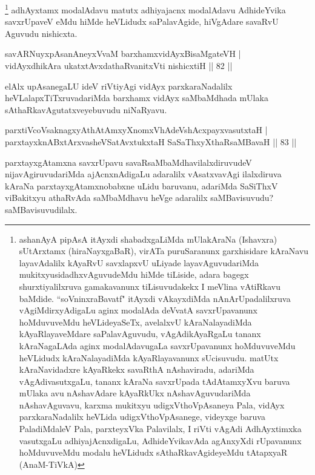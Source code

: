 \begin{artha}%
\footnote[1]{ashanAyA pipAsA itAyxdi shabadxgaLiMda mUlakAraNa (Ishavxra) sUtArxtamx (hiraNayxgaBaR), virATa puruSaranunx garxhisidare kAraNavu layavAdalilx kAyaRvU savxlapxvU uLiyade layavAguvudariMda mukitxyusidadhxvAguvudeMdu hiMde tiLiside, adara bagegx shurxtiyalilxruva gamakavanunx tiLisuvudakekx I meVlina vAtiRkavu baMdide. ``soV\s ninxraBavatf" itAyxdi vAkayxdiMda nAnArUpadalilxruva vAgiMdirxyAdigaLu aginx modalAda deVvatA savxrUpavanunx hoMduvuveMdu heVLideyaSeTx, avelalxvU kAraNalayadiMda kAyaRlayaveMdare saPalavAguvudu, vAgAdikAyaRgaLu tananx kAraNagaLAda aginx modalAdavugaLa savxrUpavanunx hoMduvuveMdu heVLidudx kAraNalayadiMda kAyaRlayavanunx sUcisuvudu. matUtx kAraNavidadxre kAyaRkekx savaRthA nAshaviradu, adariMda vAgAdivasutxgaLu, tananx kAraNa savxrUpada tAdAtamxyXvu baruva mUlaka avu nAshavAdare kAyaRkUkx nAshavAguvudariMda nAshavAguvavu, karxma mukitxyu udigxVthoVpAsaneya Pala, vidAyx parxkaraNadalilx heVLida udigxVthoVpAsanege, videyxge baruva PaladiMdaleV Pala, parxteyxVka Palavilalx, I riVti vAgAdi AdhAyxtimxka vasutxgaLu adhiyajAcnxdigaLu, AdhideYvikavAda agAnxyXdi rUpavanunx hoMduvuveMdu modalu heVLidudx sAthaRkavAgideyeMdu tAtapxyaR (AnaM-TiVkA)} adhAyxtamx modalAdavu matutx adhiyajacnx modalAdavu AdhideYvika savxrUpaveV eMdu hiMde heVLidudx saPalavAgide, hiVgAdare savaRvU Aguvudu nishicxta.
\end{artha}

\begin{shl}
savARNuyxpAsanAneyxVvaM barxhamxvidAyxBisaMgateVH |\\
vidAyxdhikAra ukatxtAvxdathaRvanitxVti nishicxtiH \hfill || 82 ||
\end{shl}

\begin{artha}%
elAlx upAsanegaLU ideV riVtiyAgi vidAyx parxkaraNadalilx heVLalapxTiTxruvadariMda barxhamx vidAyx saMbaMdhada mUlaka sAthaRkavAgutatxveyebuvudu niNaRyavu.
\end{artha}

\begin{shl}
parxtiVcoV\s saknagxyAthAtAmxyXnomxVhAdeVshAcxpayxvasutxtaH |\\
parxtayxknABxtArxvasheVSatAvxtukxtaH SaSaThxyXthaRsaMBavaH \hfill || 83 ||
\end{shl}

\begin{artha}
parxtayxgAtamxna savxrUpavu savaRsaMbaMdhavilalxdiruvudeV nijavAgiruvudariMda ajAcnxnAdigaLu adaralilx vAsatxvavAgi ilalxdiruva kAraNa parxtayxgAtamxnobabxne uLidu baruvanu, adariMda SaSiThxV viBakitxyu athaRvAda saMbaMdhavu heVge adaralilx saMBavisuvudu? saMBavisuvudilalx.
\end{artha}


